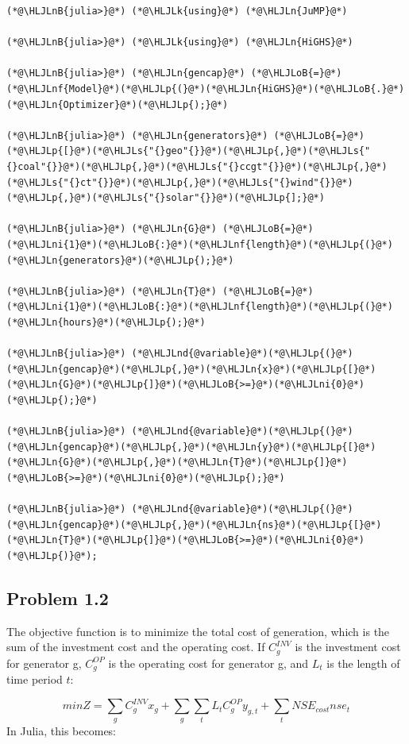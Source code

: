 \documentclass[12pt,a4paper]{article}
\newcommand{\HLJLk}[1]{\textcolor[RGB]{148,91,176}{\textbf{#1}}}
\newcommand{\HLJLn}[1]{#1}
\newcommand{\HLJLnd}[1]{\textcolor[RGB]{214,102,97}{#1}}
\newcommand{\HLJLnf}[1]{\textcolor[RGB]{66,102,213}{#1}}
\newcommand{\HLJLs}[1]{\textcolor[RGB]{201,61,57}{#1}}
\newcommand{\HLJLnB}[1]{\textcolor[RGB]{59,151,46}{#1}}
\newcommand{\HLJLni}[1]{\textcolor[RGB]{59,151,46}{#1}}
\newcommand{\HLJLoB}[1]{\textcolor[RGB]{102,102,102}{\textbf{#1}}}
\newcommand{\HLJLp}[1]{#1}
\begin{document}
\begin{lstlisting}
(*@\HLJLnB{julia>}@*) (*@\HLJLk{using}@*) (*@\HLJLn{JuMP}@*)

(*@\HLJLnB{julia>}@*) (*@\HLJLk{using}@*) (*@\HLJLn{HiGHS}@*)

(*@\HLJLnB{julia>}@*) (*@\HLJLn{gencap}@*) (*@\HLJLoB{=}@*) (*@\HLJLnf{Model}@*)(*@\HLJLp{(}@*)(*@\HLJLn{HiGHS}@*)(*@\HLJLoB{.}@*)(*@\HLJLn{Optimizer}@*)(*@\HLJLp{);}@*)

(*@\HLJLnB{julia>}@*) (*@\HLJLn{generators}@*) (*@\HLJLoB{=}@*) (*@\HLJLp{[}@*)(*@\HLJLs{"{}geo"{}}@*)(*@\HLJLp{,}@*)(*@\HLJLs{"{}coal"{}}@*)(*@\HLJLp{,}@*)(*@\HLJLs{"{}ccgt"{}}@*)(*@\HLJLp{,}@*)(*@\HLJLs{"{}ct"{}}@*)(*@\HLJLp{,}@*)(*@\HLJLs{"{}wind"{}}@*)(*@\HLJLp{,}@*)(*@\HLJLs{"{}solar"{}}@*)(*@\HLJLp{];}@*)

(*@\HLJLnB{julia>}@*) (*@\HLJLn{G}@*) (*@\HLJLoB{=}@*) (*@\HLJLni{1}@*)(*@\HLJLoB{:}@*)(*@\HLJLnf{length}@*)(*@\HLJLp{(}@*)(*@\HLJLn{generators}@*)(*@\HLJLp{);}@*)

(*@\HLJLnB{julia>}@*) (*@\HLJLn{T}@*) (*@\HLJLoB{=}@*) (*@\HLJLni{1}@*)(*@\HLJLoB{:}@*)(*@\HLJLnf{length}@*)(*@\HLJLp{(}@*)(*@\HLJLn{hours}@*)(*@\HLJLp{);}@*)

(*@\HLJLnB{julia>}@*) (*@\HLJLnd{@variable}@*)(*@\HLJLp{(}@*)(*@\HLJLn{gencap}@*)(*@\HLJLp{,}@*)(*@\HLJLn{x}@*)(*@\HLJLp{[}@*)(*@\HLJLn{G}@*)(*@\HLJLp{]}@*)(*@\HLJLoB{>=}@*)(*@\HLJLni{0}@*)(*@\HLJLp{);}@*)

(*@\HLJLnB{julia>}@*) (*@\HLJLnd{@variable}@*)(*@\HLJLp{(}@*)(*@\HLJLn{gencap}@*)(*@\HLJLp{,}@*)(*@\HLJLn{y}@*)(*@\HLJLp{[}@*)(*@\HLJLn{G}@*)(*@\HLJLp{,}@*)(*@\HLJLn{T}@*)(*@\HLJLp{]}@*)(*@\HLJLoB{>=}@*)(*@\HLJLni{0}@*)(*@\HLJLp{);}@*)

(*@\HLJLnB{julia>}@*) (*@\HLJLnd{@variable}@*)(*@\HLJLp{(}@*)(*@\HLJLn{gencap}@*)(*@\HLJLp{,}@*)(*@\HLJLn{ns}@*)(*@\HLJLp{[}@*)(*@\HLJLn{T}@*)(*@\HLJLp{]}@*)(*@\HLJLoB{>=}@*)(*@\HLJLni{0}@*)(*@\HLJLp{)}@*);
\end{lstlisting}

\subsection{Problem 1.2}
The objective function is to minimize the total cost of generation, which is the sum of the investment cost and the operating cost.  If $C_g^{INV}$ is the investment cost for generator g, $C_g^{OP}$ is the operating cost for generator g, and $L_t$ is the length  of time period $t$:

\[
minZ = \sum_g C_g^{INV}x_g + \sum_g\sum_t L_t C_g^{OP} y_{g,t} + \sum_t NSE_{cost} nse_t
\]
In Julia, this becomes:
\end{document}
